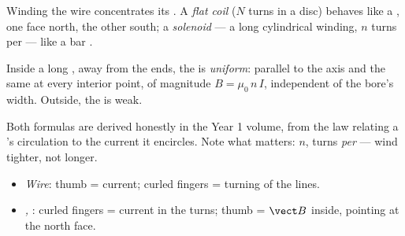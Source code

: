 \begin{definition}\label{def:g11:magnetic-fields:solenoid}
Winding the wire concentrates its . A \emph{flat
coil} ($N$ turns in a disc) behaves like a  ,
one face north, the other south; a \emph{solenoid} ---
a long cylindrical winding, $n$ turns per  --- like a bar .
\end{definition}

\begin{proposition}\label{prop:g11:magnetic-fields:solenoidfield}
Inside a long , away from the ends, the  is
\emph{uniform}: parallel to the axis and the same at every interior
point, of magnitude $B = \mu_0\, n\, I$, independent of the bore's
width. Outside, the  is weak.
\end{proposition}
\admitted

\begin{remark}
Both formulas are derived honestly in the Year 1 volume, from the law
relating a 's circulation to the current it encircles. Note what
matters: $n$, turns \emph{per } --- wind tighter, not longer.
\end{remark}

\begin{method}\label{met:g11:magnetic-fields:righthand}
\begin{itemize}
  \item \emph{Wire}: thumb = current; curled fingers = turning of the lines.
  \item \emph{, }: curled fingers = current in the turns;
        thumb = $\vect B$ inside, pointing at the north face.
\end{itemize}
\end{method}

